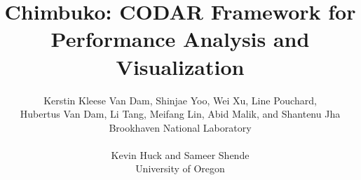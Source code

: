 \documentclass[11pt]{article}
\newcommand{\TITLE}{Chimbuko: CODAR Framework for Performance Analysis and Visualization}
\begin{document}
\pagestyle{empty}

\title{\TITLE{}}
\date{}
\author{Kerstin Kleese Van Dam, Shinjae Yoo, Wei Xu, Line Pouchard, \\ Hubertus Van Dam, Li Tang, Meifang Lin, Abid Malik, and Shantenu Jha\\ Brookhaven National Laboratory\\ \\ Kevin Huck and Sameer Shende\\ University of Oregon}



\pagebreak

\renewcommand{\contentsname}{{\huge Table of contents}}

\tableofcontents

\clearpage
\maketitle

\pagestyle{plain}
\setcounter{page}{1}









\\ \\

\end{document}
